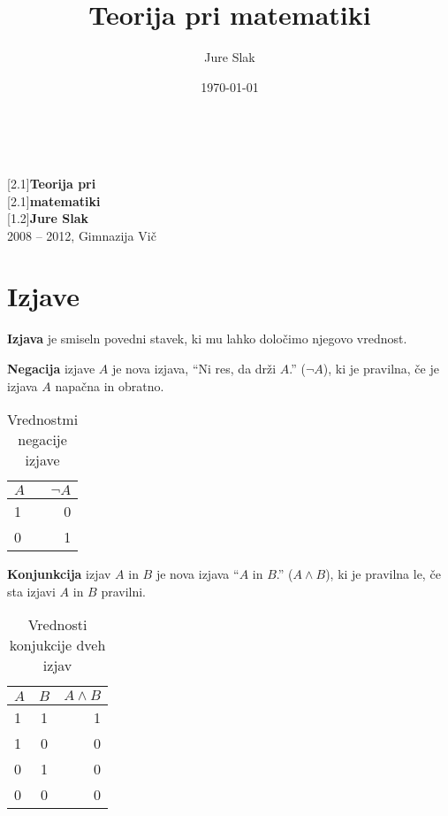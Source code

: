 \documentclass[a4paper,oneside,12pt,fleqn]{article}
\title{Teorija pri matematiki}
\author{Jure Slak}
\date{\today}
\numberwithin{equation}{section}
\begin{document}
\setlength{\abovedisplayskip}{3pt}
\setlength{\belowdisplayskip}{6pt}

\renewcommand{\listfigurename}{Kazalo slik}

\thispagestyle{empty}

\mbox{}\\
\vspace{3ex}

\noindent \scalebox{1.8}[2.1]{\textsf{{\Huge \bfseries Teorija pri}}} \\[5pt]
\scalebox{1.8}[2.1]{\textsf{{\Huge \bfseries matematiki}}} \\[60pt]
\scalebox{1}[1.2]{\textsf{\Huge \bfseries Jure Slak}} \\[45pt]
\textsf{2008 -- 2012, Gimnazija Vič}

\vspace{-10pt}
\noindent \mbox{} \hspace{-20pt} 

\vfill
\hfill
\vspace{-5ex}
\scalebox{0.7}{v. 0.98}

\pagebreak

\thispagestyle{empty}
\tableofcontents
\pagebreak

\section{Izjave}
\label{sec:izjave}
\textbf{Izjava} je smiseln povedni stavek, ki mu lahko določimo njegovo vrednost.

\textbf{Negacija} izjave $A$ je nova izjava, ``Ni res, da drži $A$.'' ($\neg A$), ki je pravilna, če je izjava $A$
napačna in obratno.
\begin{table}[h]
  \centering
  \label{tab:izjave:neg}
  \begin{tabular}{ | l | r |}
    \hline
    $A$ & $\neg A$\\
    \hline
    1 & 0 \\
    \hline
    0 & 1 \\
    \hline
  \end{tabular}
  \caption{Vrednostmi negacije izjave}
\end{table}

\textbf{Konjunkcija} izjav $A$ in $B$ je nova izjava ``$A$ in $B$.'' ($A \land
B$), ki je pravilna le, če sta izjavi $A$ in $B$ pravilni.
\begin{table}[h]
  \centering
  \label{tab:izjave:konj}
  \begin{tabular}{ | l | c | r |}
    \hline
    $A$ & $B$ & $A \land B$\\
    \hline
    1 & 1 & 1\\
    \hline
    1 & 0 & 0\\
    \hline
    0 & 1 & 0\\
    \hline
    0 & 0 & 0\\
    \hline
  \end{tabular}
  \caption{Vrednosti konjukcije dveh izjav}
\end{table}
\end{document}
